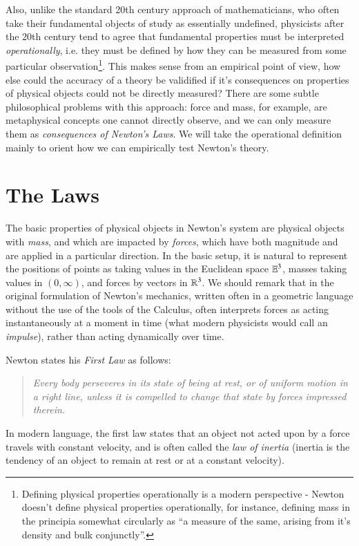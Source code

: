 Also, unlike the standard 20th century approach of mathematicians, who often take their fundamental objects of study as essentially undefined, physicists after the 20th century tend to agree that fundamental properties must be interpreted \emph{operationally}, i.e. they must be defined by how they can be measured from some particular observation\footnote{Defining physical properties operationally is a modern perspective - Newton doesn't define physical properties operationally, for instance, defining mass in the principia somewhat circularly as ``a measure of the same, arising from it's density and bulk conjunctly''.}. This makes sense from an empirical point of view, how else could the accuracy of a theory be validified if it's consequences on properties of physical objects could not be directly measured? There are some subtle philosophical problems with this approach: force and mass, for example, are metaphysical concepts one cannot directly observe, and we can only measure them as \emph{consequences of Newton's Laws}. We will take the operational definition mainly to orient how we can empirically test Newton's theory.

\section{The Laws}

The basic properties of physical objects in Newton's system are physical objects with \emph{mass}, and which are impacted by \emph{forces}, which have both magnitude and are applied in a particular direction. In the basic setup, it is natural to represent the positions of points as taking values in the Euclidean space $\operatorname{\mathbb{E}}^3$, masses taking values in $(0,\infty)$, and forces by vectors in $\operatorname{\mathbb{R}}^3$. We should remark that in the original formulation of Newton's mechanics, written often in a geometric language without the use of the tools of the Calculus, often interprets forces as acting instantaneously at a moment in time (what modern physicists would call an \emph{impulse}), rather than acting dynamically over time.

Newton states his \emph{First Law} as follows:
%
\begin{quote}
    \emph{Every body perseveres in its state of being at rest, or of uniform motion in a right line, unless it is compelled to change that state by forces impressed therein.}
\end{quote}
%
In modern language, the first law states that an object not acted upon by a force travels with constant velocity, and is often called the \emph{law of inertia} (inertia is the tendency of an object to remain at rest or at a constant velocity).

